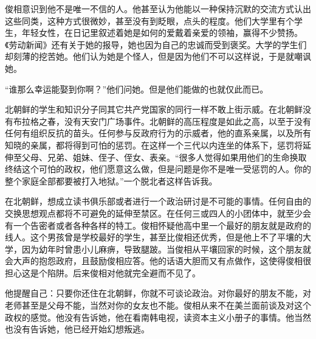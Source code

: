 俊相意识到他不是唯一不信的人。他甚至认为他能以一种保持沉默的交流方式认出这些同类，这种方式很微妙，甚至没有到眨眼，点头的程度。他们大学里有个学生，年轻女性，在日记里叙述着她是如何的爱戴着亲爱的领袖，赢得不少赞扬。《劳动新闻》还有关于她的报导，她也因为自己的忠诚而受到褒奖。大学的学生们却刻薄的挖苦她。他们认为她是个怪人，但是因为他们不可以这样说，于是就嘲讽她。

“谁那么幸运能娶到你啊？”他们问她。但是他们能做的也就仅此而已。

北朝鲜的学生和知识分子同其它共产党国家的同行一样不敢上街示威。在北朝鲜没有布拉格之春，没有天安门广场事件。北朝鲜的高压程度是如此之高，以至于没有任何有组织反抗的苗头。任何参与反政府行为的示威者，他的直系亲属，以及所有知晓的亲属，都将得到可怕的惩罚。在这样一个三代以内连坐的体系下，惩罚将延伸至父母、兄弟、姐妹、侄子、侄女、表亲。“很多人觉得如果用他们的生命换取终结这个可怕的政权，他们愿意这么做，但是问题是你不是唯一受惩罚的人。你的整个家庭全部都要被打入地狱。”一个脱北者这样告诉我。

在北朝鲜，想成立读书俱乐部或者进行一个政治研讨是不可能的事情。任何自由的交换思想观点都将不可避免的延伸至禁区。在任何三或四人的小团体中，就至少会有一个告密者或者各种各样的特工。俊相怀疑他高中里一个最好的朋友就是政府的线人。这个男孩曾是学校最好的学生，甚至比俊相还优秀，但是他上不了平壤的大学，因为幼年时曾患小儿麻痹，导致腿跛。当俊相从平壤回家的时候，这个朋友就会大声的抱怨政府，且鼓励俊相应答。他的话语大胆而又有点做作，这使得俊相很担心这是个陷阱。后来俊相对他就完全避而不见了。

他提醒自己：只要你还住在北朝鲜，你就不可谈论政治。对你最好的朋友不能，对老师甚至是父母不能，当然对你的女友也不能。俊相从来不在美兰面前谈及对这个政权的感觉。他没有告诉她，他在看南韩电视，读资本主义小册子的事情。他当然也没有告诉她，他已经开始幻想叛逃。
